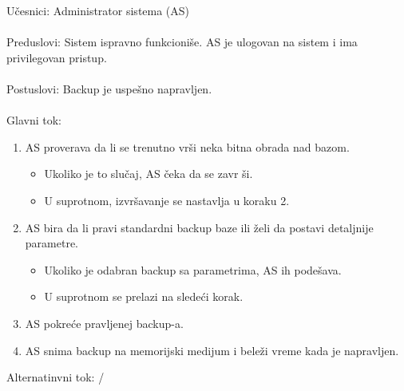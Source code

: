 \noindent U\v cesnici: Administrator sistema (AS)
\\
\\ Preduslovi: Sistem ispravno funkcioni\v se. AS je ulogovan na sistem i ima privilegovan pristup.
\\
\\ Postuslovi: Backup je uspe\v sno napravljen.
\\
\\ Glavni tok:
\begin{enumerate}
	\item AS proverava da li se trenutno vr\v si neka bitna obrada nad bazom.
	\begin{itemize}
		\item Ukoliko je to slu\v caj, AS \v ceka da se zavr \v si.
		\item U suprotnom, izvr\v savanje se nastavlja u koraku 2.
	\end{itemize}
	\item AS bira da li pravi standardni backup baze ili \v zeli da postavi detaljnije parametre.
	\begin{itemize}
		\item Ukoliko je odabran backup sa parametrima, AS ih pode\v sava.
		\item U suprotnom se prelazi na slede\' ci korak.
	\end{itemize}
	\item AS pokre\' ce pravljenej backup-a.
	\item AS snima backup na memorijski medijum i bele\v zi vreme kada je napravljen.
\end{enumerate}

\noindent Alternatinvni tok: /